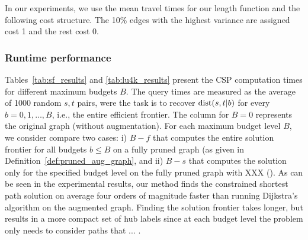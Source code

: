 In our experiments, we use the mean travel times for our length function and the following cost structure. The 10\% edges with the highest variance are assigned cost 1 and the rest cost 0.

\subsubsection{Runtime performance}


Tables~\ref{tab:sf_results} and \ref{tab:lu4k_results} present the CSP computation times for different maximum budgets $B$. The query times are measured as the average of 1000 random $s,t$ pairs, were the task is to recover $\text{dist}(s,t|b)$ for every $b=0,1,\ldots,B$, i.e., the entire efficient frontier.  The column for $B=0$ represents the original graph (without augmentation). For each maximum budget level $B$, we consider compare two cases: i) $B-f$ that computes the entire solution frontier for all budgets $b\leq B$ on a fully pruned graph (as given in Definition~\ref{def:pruned_aug_graph}, and ii) $B-s$ that computes the solution only for the specified budget level on the fully pruned graph with XXX (). As can be seen in the experimental results, our method finds the constrained shortest path solution on average four orders of magnitude faster than running Dijkstra's algorithm on the augmented graph. Finding the solution frontier takes longer, but results in a more compact set of hub labels since at each budget level the problem only needs to consider paths that ... . 

